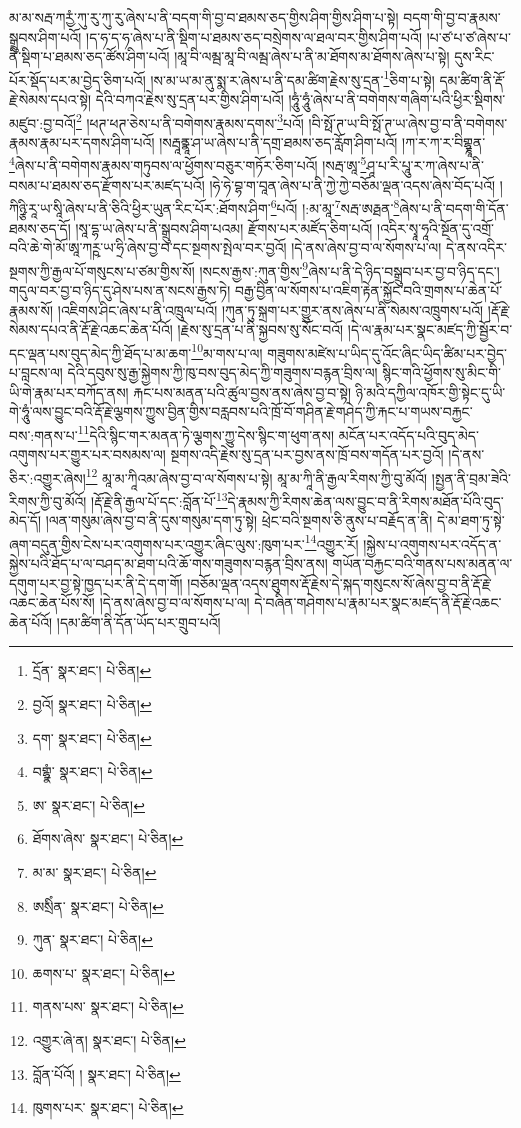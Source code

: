 མ་མ་སརྦ་ཀརྱཾ་ཀུ་རུ་ཀུ་རུ་ཞེས་པ་ནི་བདག་གི་བྱ་བ་ཐམས་ཅད་གྱིས་ཤིག་གྱིས་ཤིག་པ་སྟེ། བདག་གི་བྱ་བ་རྣམས་སྒྲུབས་ཤིག་པའོ། །ད་ཧ་ད་ཧ་ཞེས་པ་ནི་སྡིག་པ་ཐམས་ཅད་བསྲེགས་ལ་ཐལ་བར་གྱིས་ཤིག་པའོ། །པ་ཙ་པ་ཙ་ཞེས་པ་ནི་སྡིག་པ་ཐམས་ཅད་ཚོས་ཤིག་པའོ། །མཱ་བི་ལམྦ་མཱ་བི་ལམྦ་ཞེས་པ་ནི་མ་ཐོགས་མ་ཐོགས་ཞེས་པ་སྟེ། དུས་རིང་པོར་སྡོད་པར་མ་བྱེད་ཅིག་པའོ། །ས་མ་ཡ་མ་ནུ་སྨ་ར་ཞེས་པ་ནི་དམ་ཚིག་རྗེས་སུ་དྲན་\footnote{དྲོན་  སྣར་ཐང་།  པེ་ཅིན། }ཅིག་པ་སྟེ། དམ་ཚིག་ནི་རྡོ་རྗེ་སེམས་དཔའ་སྟེ། དེའི་བཀའ་རྗེས་སུ་དྲན་པར་གྱིས་ཤིག་པའོ། །ཧཱུཾ་ཧཱུཾ་ཞེས་པ་ནི་བགེགས་གཞིག་པའི་ཕྱིར་སྡིགས་མཛུབ་:བྱ་བའོ།\footnote{བྱའོ།  སྣར་ཐང་།  པེ་ཅིན། } །ཕཊ་ཕཊ་ཅེས་པ་ནི་བགེགས་རྣམས་དགས་\footnote{དག་  སྣར་ཐང་།  པེ་ཅིན། }པའོ། །བི་སྥོ་ཊ་ཡ་བི་སྥོ་ཊ་ཡ་ཞེས་བྱ་བ་ནི་བགེགས་རྣམས་རྣམ་པར་དགས་ཤིག་པའོ། །སརྦཱནྣཱ་ཤ་ཡ་ཞེས་པ་ནི་དགྲ་ཐམས་ཅད་རློག་ཤིག་པའོ། །ཀ་ར་ཀ་ར་བིགྷྣཱན་\footnote{བགྷྣཾ་  སྣར་ཐང་།  པེ་ཅིན། }ཞེས་པ་ནི་བགེགས་རྣམས་གཏུབས་ལ་ཕྱོགས་བཅུར་གཏོར་ཅིག་པའོ། །སརྦ་ཨཱ་\footnote{ཨ་  སྣར་ཐང་།  པེ་ཅིན། }ཤཱ་པ་རི་པཱུ་ར་ཀ་ཞེས་པ་ནི་བསམ་པ་ཐམས་ཅད་རྫོགས་པར་མཛད་པའོ། །ཧེ་ཧེ་བྷ་ག་བཱན་ཞེས་པ་ནི་ཀྱེ་ཀྱེ་བཅོམ་ལྡན་འདས་ཞེས་བོད་པའོ། །ཀིཉྩི་རཱ་ཡ་སཱི་ཞེས་པ་ནི་ཅིའི་ཕྱིར་ཡུན་རིང་པོར་:ཐོགས་ཤིག་\footnote{ཐོགས་ཞེས་  སྣར་ཐང་།  པེ་ཅིན། }པའོ། །:མ་མཱ་\footnote{མ་མ་  སྣར་ཐང་།  པེ་ཅིན། }སརྦ་ཨརྠན་\footnote{ཨསྲིཾན་  སྣར་ཐང་།  པེ་ཅིན། }ཞེས་པ་ནི་བདག་གི་དོན་ཐམས་ཅད་དོ། །སཱ་དྷ་ཡ་ཞེས་པ་ནི་སྒྲུབས་ཤིག་པའམ། རྫོགས་པར་མཛོད་ཅིག་པའོ། །འདིར་སྭཱ་ཧཱའི་སྔོན་དུ་འགྲོ་བའི་ཆེ་གེ་མོ་ཨཱ་ཀཪྵ་ཡ་ཧྲི་ཞེས་བྱ་བ་དང་སྔགས་སྤེལ་བར་བྱའོ། །དེ་ནས་ཞེས་བྱ་བ་ལ་སོགས་པ་ལ། དེ་ནས་འདིར་སྔགས་ཀྱི་རྒྱལ་པོ་གསུངས་པ་ཙམ་གྱིས་སོ། །སངས་རྒྱས་:ཀུན་གྱིས་\footnote{ཀུན་  སྣར་ཐང་།  པེ་ཅིན། }ཞེས་པ་ནི་དེ་ཉིད་བསྒྲུབ་པར་བྱ་བ་ཉིད་དང་། གདུལ་བར་བྱ་བ་ཉིད་དུ་ཤེས་པས་ན་སངས་རྒྱས་ཏེ། བརྒྱ་བྱིན་ལ་སོགས་པ་འཇིག་རྟེན་སྐྱོང་བའི་གྲགས་པ་ཆེན་པོ་རྣམས་སོ། །འཇིགས་ཤིང་ཞེས་པ་ནི་འཁྲུལ་པའོ། །ཀུན་ཏུ་སྐྲག་པར་གྱུར་ནས་ཞེས་པ་ནི་སེམས་འཁྲུགས་པའོ། །རྡོ་རྗེ་སེམས་དཔའ་ནི་རྡོ་རྗེ་འཆང་ཆེན་པོའོ། །རྗེས་སུ་དྲན་པ་ནི་སྐྱབས་སུ་སོང་བའོ། །དེ་ལ་རྣམ་པར་སྣང་མཛད་ཀྱི་སྦྱོར་བ་དང་ལྡན་པས་བུད་མེད་ཀྱི་ཐོད་པ་མ་ཆག་\footnote{ཆགས་པ་  སྣར་ཐང་།  པེ་ཅིན། }མ་གས་པ་ལ། གཟུགས་མཛེས་པ་ཡིད་དུ་འོང་ཞིང་ཡིད་ཚིམ་པར་བྱེད་པ་བླངས་ལ། དེའི་དབུས་སུ་རྒྱ་སྐྱེགས་ཀྱི་ཁུ་བས་བུད་མེད་ཀྱི་གཟུགས་བརྙན་བྲིས་ལ། སྙིང་གའི་ཕྱོགས་སུ་མིང་གི་ཡི་གེ་རྣམ་པར་བཀོད་ནས། རྐང་པས་མནན་པའི་ཚུལ་བྱས་ནས་ཞེས་བྱ་བ་སྟེ། ཉི་མའི་དཀྱིལ་འཁོར་གྱི་སྟེང་དུ་ཡི་གེ་ཧཱུཾ་ལས་བྱུང་བའི་རྡོ་རྗེ་ལྕགས་ཀྱུས་བྱིན་གྱིས་བརླབས་པའི་ཁྲོ་བོ་གཤིན་རྗེ་གཤེད་ཀྱི་རྐང་པ་གཡས་བརྐྱང་བས་:གནས་པ་\footnote{གནས་པས་  སྣར་ཐང་།  པེ་ཅིན། }དེའི་སྙིང་གར་མནན་ཏེ་ལྕགས་ཀྱུ་དེས་སྙིང་ག་ཕུག་ནས། མངོན་པར་འདོད་པའི་བུད་མེད་འགུགས་པར་གྱུར་པར་བསམས་ལ། སྔགས་འདི་རྗེས་སུ་དྲན་པར་བྱས་ནས་ཁྲོ་བས་གདོན་པར་བྱའོ། །དེ་ནས་ཅིར་:འགྱུར་ཞེས།\footnote{འགྱུར་ཞེ་ན།  སྣར་ཐང་།  པེ་ཅིན། } མཱ་མ་ཀཱིའམ་ཞེས་བྱ་བ་ལ་སོགས་པ་སྟེ། མཱ་མ་ཀཱི་ནི་རྒྱལ་རིགས་ཀྱི་བུ་མོའོ། །སྤྱན་ནི་བྲམ་ཟེའི་རིགས་ཀྱི་བུ་མོའོ། །རྡོ་རྗེ་ནི་རྒྱལ་པོ་དང་:བློན་པོ་\footnote{བློན་པོའོ། །  སྣར་ཐང་།  པེ་ཅིན། }དེ་རྣམས་ཀྱི་རིགས་ཆེན་ལས་བྱུང་བ་ནི་རིགས་མཐོན་པོའི་བུད་མེད་དོ། །ལན་གསུམ་ཞེས་བྱ་བ་ནི་དུས་གསུམ་དག་ཏུ་སྟེ། ཕྲེང་བའི་སྔགས་ཅི་ནུས་པ་བརྗོད་ན་ནི། དེ་མ་ཐག་ཏུ་སྟེ་ཞག་བདུན་གྱིས་ངེས་པར་འགུགས་པར་འགྱུར་ཞིང་ལུས་:ཁུག་པར་\footnote{ཁུགས་པར་  སྣར་ཐང་།  པེ་ཅིན། }འགྱུར་རོ། །སྐྱེས་པ་འགུགས་པར་འདོད་ན་སྐྱེས་པའི་ཐོད་པ་ལ་བཤད་མ་ཐག་པའི་ཆོ་གས་གཟུགས་བརྙན་བྲིས་ནས། གཡོན་བརྐྱང་བའི་གནས་པས་མནན་ལ་དགུག་པར་བྱ་སྟེ་ཁྱད་པར་ནི་དེ་དག་གོ། །བཅོམ་ལྡན་འདས་ཐུགས་རྡོ་རྗེས་དེ་སྐད་གསུངས་སོ་ཞེས་བྱ་བ་ནི་རྡོ་རྗེ་འཆང་ཆེན་པོས་སོ། །དེ་ནས་ཞེས་བྱ་བ་ལ་སོགས་པ་ལ། དེ་བཞིན་གཤེགས་པ་རྣམ་པར་སྣང་མཛད་ནི་རྡོ་རྗེ་འཆང་ཆེན་པོའོ། །དམ་ཚིག་ནི་དོན་ཡོད་པར་གྲུབ་པའོ། 